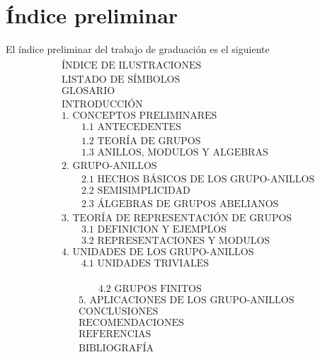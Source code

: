 \documentclass[12pt,letterpaper,titlepage]{article}
\begin{document}
\section{Índice preliminar}
El índice preliminar del trabajo de graduación es el siguiente
\begin{align*}
&\text{ÍNDICE DE ILUSTRACIONES}\\
&\text{LISTADO DE SÍMBOLOS}\\
&\text{GLOSARIO}\\
&\text{INTRODUCCIÓN}\\
&\text{1. CONCEPTOS PRELIMINARES}\\
&\qquad\text{1.1 ANTECEDENTES}\\
&\qquad\text{1.2 TEORÍA DE GRUPOS}\\
&\qquad\text{1.3 ANILLOS, MODULOS Y ALGEBRAS}\\
&\text{2. GRUPO-ANILLOS}\\
&\qquad\text{2.1 HECHOS BÁSICOS DE LOS GRUPO-ANILLOS}\\
&\qquad\text{2.2 SEMISIMPLICIDAD}\\
&\qquad\text{2.3 ÁLGEBRAS DE GRUPOS ABELIANOS}\\
&\text{3. TEORÍA DE REPRESENTACIÓN DE GRUPOS }\\
&\qquad\text{3.1 DEFINICION Y EJEMPLOS}\\
&\qquad\text{3.2 REPRESENTACIONES Y MODULOS}\\
&\text{4. UNIDADES DE LOS GRUPO-ANILLOS }\\
&\qquad\text{4.1 UNIDADES TRIVIALES}\\
\end{align*}

\newpage
\begin{align*}
&\qquad\text{4.2 GRUPOS FINITOS}\\
&\text{5. APLICACIONES DE LOS GRUPO-ANILLOS }\\
&\text{CONCLUSIONES}\\
&\text{RECOMENDACIONES}\\ %
&\text{REFERENCIAS}\\ %
&\text{BIBLIOGRAFÍA} %
\end{align*}

\newpage
\end{document}
